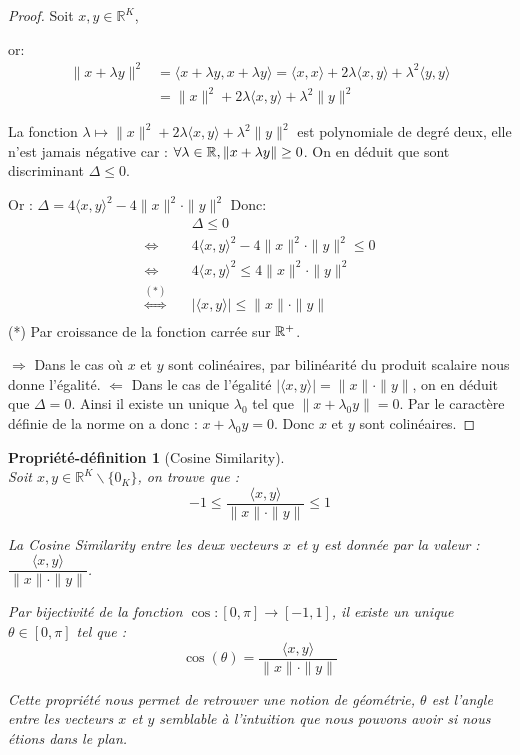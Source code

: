 \documentclass[12pt]{article}
\newtheorem{prop-def}{Propriété-définition}
\theoremstyle{definition}
\begin{document}
\begin{proof}
	Soit $x, y \in \mathbb{R}^K$,
	
	or: 
	\begin{align*}
		\|x+\lambda y\|^2 &= \langle x+\lambda y, x+\lambda y \rangle = \langle x, x\rangle + 2\lambda\langle x, y \rangle + \lambda^2\langle y,y \rangle\\
		&= \|x\|^2 + 2\lambda\langle x, y \rangle + \lambda^2\|y\|^2
	\end{align*}

La fonction $\lambda \mapsto \|x\|^2 + 2\lambda\langle x, y \rangle + \lambda^2\|y\|^2$ est polynomiale de degré deux, elle n'est jamais négative car : $\forall \lambda \in \mathbb{R} , \|x+\lambda y\|\geq 0 $. On en déduit que sont discriminant $\Delta\leq 0$.

Or : $\Delta = 4\langle x, y \rangle^2 -4\|x\|^2\cdot\|y\|^2 $ 
Donc: 
	\begin{align*}
		&\quad \Delta\leq 0\\
		\Leftrightarrow&\quad 4\langle x, y \rangle^2 -4\|x\|^2\cdot\|y\|^2 \leq 0\\
		\Leftrightarrow&\quad 4\langle x, y \rangle^2 \leq 4\|x\|^2\cdot\|y\|^2\\
		\overset{(*)}{\Leftrightarrow}&\quad |\langle x, y \rangle| \leq \|x\|\cdot\|y\|\\
	\end{align*}
(*) Par croissance de la fonction carrée sur $\mathbb{R}^+$. 

$\Rightarrow$ Dans le cas où $x$ et $y$ sont colinéaires, par bilinéarité du produit scalaire nous donne l'égalité. 
$\Leftarrow$ Dans le cas de l'égalité $|\langle x, y \rangle| = \|x\|\cdot\|y\|$, on en déduit que $\Delta = 0$. Ainsi il existe un unique $\lambda_0$ tel que $\|x+\lambda_0 y\| = 0$. Par le caractère définie de la norme on a donc : $x+\lambda_0 y = 0 $. Donc $x$ et $y$ sont colinéaires.
\end{proof}

\begin{prop-def}[Cosine Similarity]\hfill\\
	Soit $x, y \in \mathbb{R}^K\backslash\{0_K\}$, on trouve que :
	$$-1  \leq \dfrac{\langle x, y \rangle}{\|x\| \cdot\|y\|} \leq 1$$
	
	La Cosine Similarity entre les deux vecteurs $x$ et $y$ est donnée par la valeur : $\dfrac{\langle x, y \rangle}{\|x\| \cdot\|y\|}$.
	
	Par bijectivité de la fonction $\cos : [0,\pi] \to [-1,1]$, il existe un unique $\theta \in [0,\pi]$ tel que : $$\cos(\theta) = \dfrac{\langle x, y \rangle}{\|x\| \cdot\|y\|} $$
	
	Cette propriété nous permet de retrouver une notion de géométrie, $\theta$ est l'angle entre les vecteurs $x$ et $y$ semblable à l'intuition que nous pouvons avoir si nous étions dans le plan. 
\end{prop-def}
\end{document}
